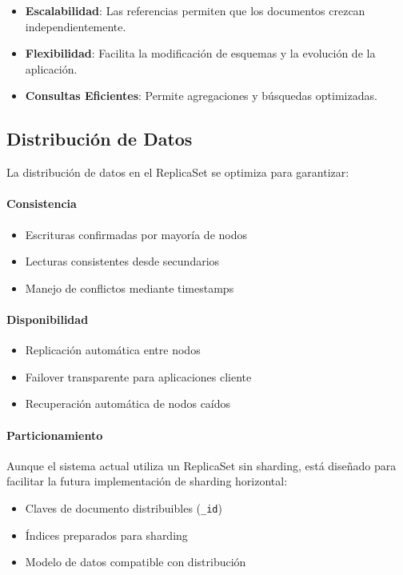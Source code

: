 \documentclass[12pt,letterpaper]{article}
\begin{document}
\begin{itemize}
    \item \textbf{Escalabilidad}: Las referencias permiten que los documentos crezcan independientemente.
    \item \textbf{Flexibilidad}: Facilita la modificación de esquemas y la evolución de la aplicación.
    \item \textbf{Consultas Eficientes}: Permite agregaciones y búsquedas optimizadas.
\end{itemize}

\subsection{Distribución de Datos}
La distribución de datos en el ReplicaSet se optimiza para garantizar:

\paragraph{Consistencia}
\begin{itemize}
    \item Escrituras confirmadas por mayoría de nodos
    \item Lecturas consistentes desde secundarios
    \item Manejo de conflictos mediante timestamps
\end{itemize}

\paragraph{Disponibilidad}
\begin{itemize}
    \item Replicación automática entre nodos
    \item Failover transparente para aplicaciones cliente
    \item Recuperación automática de nodos caídos
\end{itemize}

\paragraph{Particionamiento}
Aunque el sistema actual utiliza un ReplicaSet sin sharding, está diseñado para facilitar la futura implementación de sharding horizontal:

\begin{itemize}
    \item Claves de documento distribuibles (\texttt{\_id})
    \item Índices preparados para sharding
    \item Modelo de datos compatible con distribución
\end{itemize}
\end{document}
